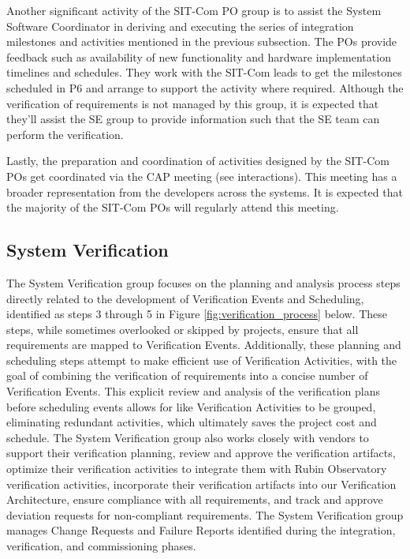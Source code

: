 \documentclass[SE,lsstdraft,authoryear,toc]{lsstdoc}
\begin{document}
Another significant activity of the SIT-Com PO group is to assist the System Software Coordinator in deriving and executing the series of integration milestones and activities mentioned in the previous subsection.
The POs provide feedback such as availability of new functionality and hardware implementation timelines and schedules.
They work with the SIT-Com leads to get the milestones scheduled in P6 and arrange to support the activity where required.
Although the verification of requirements is not managed by this group, it is expected that they’ll assist the SE group to provide information such that the SE team can perform the verification.

Lastly, the preparation and coordination of activities designed by the SIT-Com POs get coordinated via the CAP meeting (see interactions). This meeting has a broader representation from the developers across the systems. It is expected that the majority of the SIT-Com POs will regularly attend this meeting.

\subsection{System Verification}
The System Verification group focuses on the planning and analysis process steps directly related to the development of Verification Events and Scheduling, identified as steps 3 through 5 in Figure \ref{fig:verification_process} below.
These steps, while sometimes overlooked or skipped by projects, ensure that all requirements are mapped to Verification Events.
Additionally, these planning and scheduling steps attempt to make efficient use of Verification Activities, with the goal of combining the verification of requirements into a concise number of Verification Events. 
This explicit review and analysis of the verification plans before scheduling events allows for like Verification Activities to be grouped, eliminating redundant activities, which ultimately saves the project cost and schedule. 
The System Verification group also works closely with vendors to support their verification planning, review and approve the verification artifacts, optimize their verification activities to integrate them with Rubin Observatory verification activities, incorporate their verification artifacts into our Verification Architecture, ensure compliance with all requirements, and track and approve deviation requests for non-compliant requirements. 
The System Verification group manages Change Requests and Failure Reports identified during the integration, verification, and commissioning phases.
\end{document}
